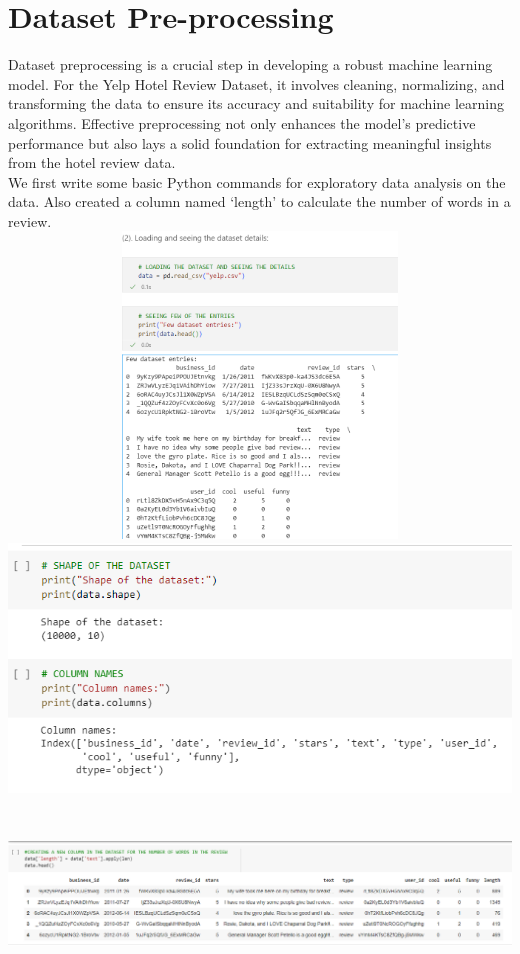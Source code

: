 \documentclass[a4paper, 12pt]{report}
\begin{document}
\section{Dataset Pre-processing}
Dataset preprocessing is a crucial step in developing a robust machine learning model. For the Yelp Hotel Review Dataset, it involves cleaning, normalizing, and transforming the data to ensure its accuracy and suitability for machine learning algorithms. Effective preprocessing not only enhances the model's predictive performance but also lays a solid foundation for extracting meaningful insights from the hotel review data.\\
We first write some basic Python commands for exploratory data analysis on the data. Also created a column named ‘length’ to calculate the number of words in a review.\\
	\includegraphics[height=3.2in,width=6in]{1}\\
	\includegraphics[scale=0.7]{2}\\
	\includegraphics[height=2in,width=6in]{3}\\
\end{document}
